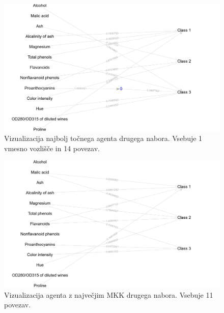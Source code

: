 \begin{figure}[H]
    \begin{center}
        \includegraphics[width=13cm]{wine/2/acc_g}
    \end{center}
    \caption{Vizualizacija najbolj točnega agenta drugega nabora. Vsebuje 1 vmesno vozlišče in 14 povezav.}
    \label{fig:wine_acc_2_g}
\end{figure}

\begin{figure}[H]
    \begin{center}
        \includegraphics[width=13cm]{wine/2/mcc_g}
    \end{center}
    \caption{Vizualizacija agenta z največjim MKK drugega nabora. Vsebuje 11 povezav.}
    \label{fig:wine_mcc_2_g}
\end{figure}

